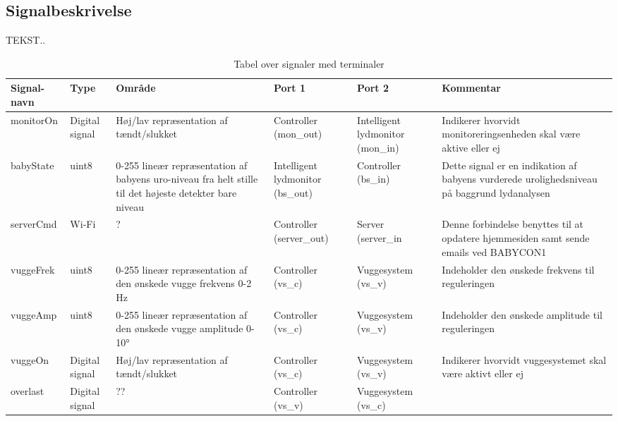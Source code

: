 
\begin{table}[H]
\subsection{Signalbeskrivelse}
TEKST..
 
\caption{Tabel over signaler med terminaler}
\begin{small}
\begin{tabular}{|p{2cm}|p{2cm}|p{2cm}|p{2cm}|p{2cm}|p{}|}
\hline

\textbf{Signal-navn}	&\textbf{Type} 		&\textbf{Område} &\textbf{Port 1} 	&\textbf{Port 2} 			&\textbf{Kommentar} \\ \hline

monitorOn 			&Digital signal  	&Høj/lav repræsentation af tændt/slukket 				
&Controller (mon\_out)		&Intelligent lydmonitor (mon\_in)			&Indikerer hvorvidt monitoreringsenheden skal være aktive eller ej					 \\\hline

babyState 			&uint8				&0-255 lineær repræsentation af babyens uro-niveau fra helt stille til det højeste detekter bare niveau 	&Intelligent lydmonitor (bs\_out) &Controller (bs\_in)			&Dette signal er en indikation af babyens vurderede urolighedsniveau på baggrund lydanalysen		\\\hline

serverCmd 			&Wi-Fi				&?	 	&Controller (server\_out)  &Server (server\_in				
&Denne forbindelse benyttes til at opdatere hjemmesiden samt sende emails ved BABYCON1					\\\hline
					
vuggeFrek			&uint8				&0-255 lineær repræsentation af den ønskede vugge frekvens 0-2 Hz  	&Controller (vs\_c)  &Vuggesystem (vs\_v)		&Indeholder den ønskede frekvens til reguleringen 	    				\\\hline

vuggeAmp				&uint8 				&0-255 lineær repræsentation af den ønskede vugge amplitude 0-10°   &Controller (vs\_c)  &Vuggesystem (vs\_v)		&Indeholder den ønskede amplitude til reguleringen   				\\\hline

vuggeOn			&Digital signal 			&Høj/lav repræsentation af tændt/slukket 
&Controller (vs\_c) 	&Vuggesystem (vs\_v)			&Indikerer hvorvidt vuggesystemet skal være aktivt eller ej 				\\\hline

overlast			&Digital signal			&??   
&Controller (vs\_v) 	&Vuggesystem (vs\_c)			&  				\\\hline


\end{tabular}
\end{small}
\end{table}
